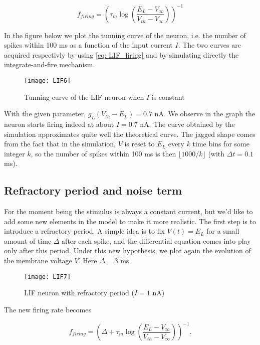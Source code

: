 \begin{equation}
  \label{eq: LIF_firing}
  f_{firing} = (\tau_m \log(\frac{E_L-V_{\infty}}{V_{th}-V_{\infty}}))^{-1}
\end{equation}

In the figure below we plot the tunning curve of the neuron, i.e. the number 
of spikes within 100 ms as a function of the input current $I$. The two curves
are acquired respectivly by using \eqref{eq: LIF_firing} and by simulating
directly the integrate-and-fire mechanism.

\vspace{-1em}
\begin{figure}[H]
  \centering
  \texttt{[image: LIF6]}
  \caption{Tunning curve of the LIF neuron when $I$ is constant}
\end{figure}

With the given parameter, $g_L(V_{th}-E_L) = 0.7$ nA. We observe in the graph
the neuron starts firing indeed at about $I = 0.7$ nA. The curve obtained by
the simulation approximates quite well the theoretical curve. The jagged shape
comes from the fact that in the simulation, $V$ is reset to $E_L$ every $k$ 
time bins for some integer $k$, so the number of spikes within 100 ms is then
$\lfloor 1000/k \rfloor$ (with $\Delta t = 0.1$ ms).


\subsection{Refractory period and noise term}

For the moment being the stimulus is always a constant current, but we'd like
to add some new elements in the model to make it more realistic. The first 
step is to introduce a refractory period. A simple idea is to fix $V(t) = E_L$ 
for a small amount of time $\Delta$ after each spike, and the differential
equation comes into play only after this period. Under this new hypothesis, 
we plot again the evolution of the membrane voltage $V$. Here $\Delta = 3$ ms.

\vspace{-1em}
\begin{figure}[H]
  \centering
  \texttt{[image: LIF7]}
  \caption{LIF neuron with refractory period ($I=1$ nA)}
\end{figure}

\noindent
The new firing rate becomes 

\begin{equation}
  \label{eq: LIF_ref_firing}
  f_{firing} = (\Delta +
                \tau_m \log(\frac{E_L-V_{\infty}}{V_{th}-V_{\infty}}))^{-1}.
\end{equation}

